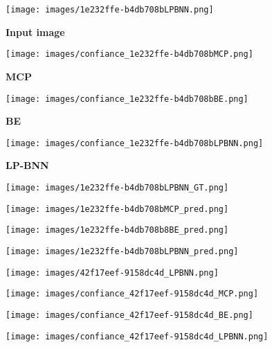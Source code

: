 \documentclass[10pt,twocolumn,letterpaper]{article}
\begin{document}
\begin{figure*}[t!]
\renewcommand{\figurename}{Figure}
\renewcommand{\captionfont}{\small}
     \centering
        \begin{subfigure}[b]{0.16\linewidth}
        \caption*{\textbf{Input image}}
        \texttt{[image: images/1e232ffe-b4db708bLPBNN.png]}
\end{subfigure}\;
        \begin{subfigure}[b]{0.16\linewidth}
        \caption*{\textbf{MCP}}
        \texttt{[image: images/confiance\_1e232ffe-b4db708bMCP.png]}
\end{subfigure}\;
        \begin{subfigure}[b]{0.16\linewidth}
        \caption*{\textbf{BE}}
        \texttt{[image: images/confiance\_1e232ffe-b4db708bBE.png]}
\end{subfigure}\;
         \begin{subfigure}[b]{0.16\linewidth}
        \caption*{\textbf{LP-BNN}}
        \texttt{[image: images/confiance\_1e232ffe-b4db708bLPBNN.png]}
\end{subfigure}\;

        \begin{subfigure}[b]{0.16\linewidth}
\texttt{[image: images/1e232ffe-b4db708bLPBNN\_GT.png]}
\end{subfigure}\;
        \begin{subfigure}[b]{0.16\linewidth}
\texttt{[image: images/1e232ffe-b4db708bMCP\_pred.png]}
\end{subfigure}\;
        \begin{subfigure}[b]{0.16\linewidth}
\texttt{[image: images/1e232ffe-b4db708b8BE\_pred.png]}
\end{subfigure}\;
         \begin{subfigure}[b]{0.16\linewidth}
\texttt{[image: images/1e232ffe-b4db708bLPBNN\_pred.png]}
\end{subfigure}\;
   
        \begin{subfigure}[b]{0.16\linewidth}
\texttt{[image: images/42f17eef-9158dc4d\_LPBNN.png]}
\end{subfigure}\;
        \begin{subfigure}[b]{0.16\linewidth}
\texttt{[image: images/confiance\_42f17eef-9158dc4d\_MCP.png]}
\end{subfigure}\;
        \begin{subfigure}[b]{0.16\linewidth}
\texttt{[image: images/confiance\_42f17eef-9158dc4d\_BE.png]}
\end{subfigure}\;
         \begin{subfigure}[b]{0.16\linewidth}
\texttt{[image: images/confiance\_42f17eef-9158dc4d\_LPBNN.png]}
\end{subfigure}\;


\end{figure*}
\end{document}
